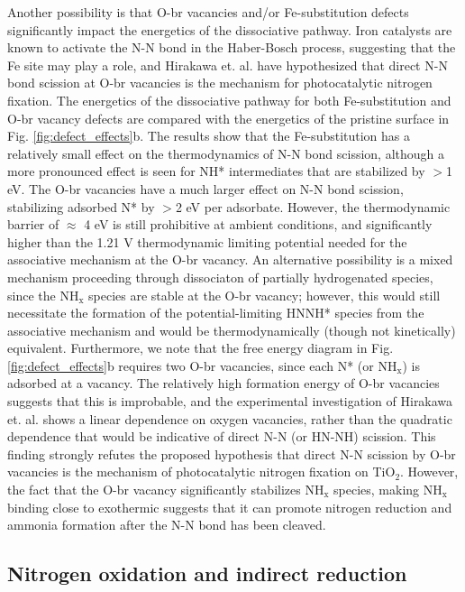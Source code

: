 \documentclass[journal=ascecg,manuscript=article,articletitle=true]{achemso}
\begin{document}
Another possibility is that O-br vacancies and/or Fe-substitution defects significantly impact the energetics of the dissociative pathway. Iron catalysts are known to activate the N-N bond in the Haber-Bosch process\cite{Emmett_1933, Honkala_2005}, suggesting that the Fe site may play a role, and Hirakawa et. al. \cite{Hirakawa_2017} have hypothesized that direct N-N bond scission at O-br vacancies is the mechanism for photocatalytic nitrogen fixation. The energetics of the dissociative pathway for both Fe-substitution and O-br vacancy defects are compared with the energetics of the pristine surface in Fig. \ref{fig:defect_effects}b. The results show that the Fe-substitution has a relatively small effect on the thermodynamics of N-N bond scission, although a more pronounced effect is seen for NH* intermediates that are stabilized by $>$1 eV. The O-br vacancies have a much larger effect on N-N bond scission, stabilizing adsorbed N* by $>$2 eV per adsorbate. However, the thermodynamic barrier of $\approx$ 4 eV is still prohibitive at ambient conditions, and significantly higher than the 1.21 V thermodynamic limiting potential needed for the associative mechanism at the O-br vacancy. An alternative possibility is a mixed mechanism proceeding through dissociaton of partially hydrogenated species, since the NH$_{\mathrm{x}}$ species are stable at the O-br vacancy; however, this would still necessitate the formation of the potential-limiting HNNH* species from the associative mechanism and would be thermodynamically (though not kinetically) equivalent. Furthermore, we note that the free energy diagram in Fig. \ref{fig:defect_effects}b requires two O-br vacancies, since each N* (or NH$_{\mathrm{x}}$) is adsorbed at a vacancy. The relatively high formation energy of O-br vacancies suggests that this is improbable, and the experimental investigation of Hirakawa et. al. \cite{Hirakawa_2017} shows a linear dependence on oxygen vacancies, rather than the quadratic dependence that would be indicative of direct N-N (or HN-NH) scission. This finding strongly refutes the proposed hypothesis that direct N-N scission by O-br vacancies is the mechanism of photocatalytic nitrogen fixation on TiO$_2$. However, the fact that the O-br vacancy significantly stabilizes NH$_{\mathrm{x}}$ species, making NH$_{\mathrm{x}}$ binding close to exothermic suggests that it can promote nitrogen reduction and ammonia formation after the N-N bond has been cleaved.

\subsection{Nitrogen oxidation and indirect reduction}
\end{document}
